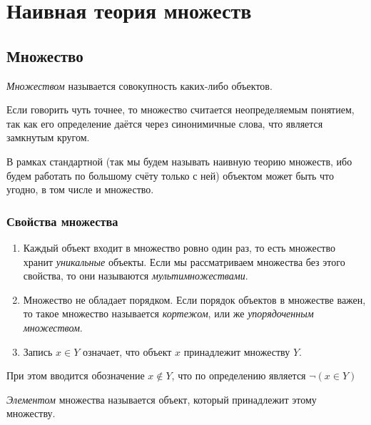 \section{Наивная теория множеств}
 
\subsection{Множество}
 
\begin{definition}
    \textit{Множеством} называется совокупность каких-либо объектов.
\end{definition}
 
\begin{note}
    Если говорить чуть точнее, то множество считается неопределяемым понятием, так как его определение даётся через синонимичные слова, что является замкнутым кругом.
\end{note}
 
\begin{note}
    В рамках стандартной (так мы будем называть наивную теорию множеств, ибо будем работать по большому счёту только с ней) объектом может быть что угодно, в том числе и множество.
\end{note}
 
\subsubsection{Свойства множества}
 
\begin{enumerate}
     \item Каждый объект входит в множество ровно один раз, то есть множество хранит \textit{уникальные} объекты. Если мы рассматриваем множества без этого свойства, то они называются \textit{мультимножествами}.
     \item Множество не обладает порядком. Если порядок объектов в множестве важен, то такое множество называется \textit{кортежом}, или же \textit{упорядоченным множеством}.
     \item Запись $x \in Y$ означает, что объект $x$ принадлежит множеству $Y$.
\end{enumerate}

\begin{note}
	При этом вводится обозначение $x \notin Y$, что по определению является $\neg (x \in Y)$
\end{note}
 
\begin{definition}
    \textit{Элементом} множества называется объект, который принадлежит этому множеству.
\end{definition}
 
